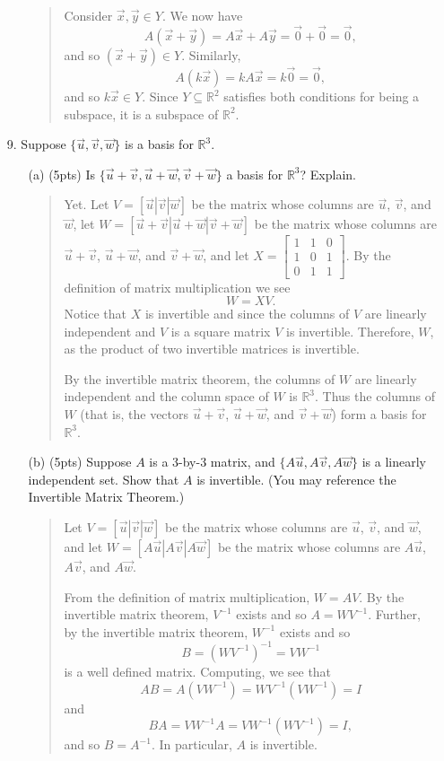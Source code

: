 \documentclass[11pt]{article}
\newcommand{\R}{\mathbb{R}}
\newcommand{\mat}[1]{\begin{bmatrix}#1\end{bmatrix}}
\newenvironment{answer}{\begin{quote}\sffamily}{\end{quote}}
\begin{document}
\begin{enumerate}
\begin{enumerate}
\begin{answer}
			Consider $\vec x,\vec y\in Y$.  We now have
			\[
				A(\vec x+\vec y)=A\vec x+A\vec y=\vec 0+\vec 0=\vec 0,
			\]
			and so $(\vec x+\vec y)\in Y$.  Similarly,
			\[
				A(k\vec x)=kA\vec x=k\vec 0=\vec 0,
			\]
			and so $k\vec x\in Y$.  Since $Y\subseteq \R^2$ satisfies both conditions for being a subspace, it is
			a subspace of $\R^2$.
		\end{answer}
	\end{enumerate}
	
	\newpage
	\item[9.] Suppose $\{\vec{u},\vec{v},\vec{w}\}$ is a basis for $\R^3$.
	\begin{enumerate}
		\item[(a) (5pts)] Is $\{\vec{u} + \vec{v}, \vec{u}+\vec{w}, \vec{v}+\vec{w}\}$ a basis for $\R^3$?  Explain.
		\begin{answer}
			Yet.  Let $V=[\vec u|\vec v|\vec w]$ be the matrix whose columns are $\vec u$, $\vec v$, and $\vec w$,
			let $W=[\vec u+\vec v|\vec u+\vec w|\vec v+\vec w]$ be the matrix whose columns are $\vec u+\vec v$,
			$\vec u+\vec w$, and $\vec v+\vec w$, 
			and let $X=\mat{1&1&0\\1&0&1\\0&1&1}$.  By the definition of matrix multiplication we see
			\[
				W=XV.
			\]
			Notice that $X$ is invertible and since the columns of $V$ are linearly independent and $V$ is a square
			matrix $V$ is invertible.  Therefore, $W$, as the product of two invertible matrices is invertible.

			By the invertible matrix theorem, the columns of $W$ are linearly independent and the column space of $W$
			is $\R^3$.  Thus the columns of $W$ (that is, the vectors $\vec u+\vec v$,
			$\vec u+\vec w$, and $\vec v+\vec w$) form a basis for $\R^3$.
		\end{answer}
		
		\item[(b) (5pts)] Suppose $A$ is a 3-by-3 matrix, and $\{A\vec{u},A\vec{v},A\vec{w}\}$ is a linearly independent set.  Show that $A$ is invertible.  (You may reference the Invertible Matrix Theorem.)
		\begin{answer}
			Let $V=[\vec u|\vec v|\vec w]$ be the matrix whose columns are $\vec u$, $\vec v$, and $\vec w$,
			and let $W=[A\vec u|A\vec v|A\vec w]$ be the matrix whose columns are $A\vec u$, $A\vec v$, and $A\vec w$.

			From the definition of matrix multiplication, $W=AV$.  By the invertible matrix theorem,
			$V^{-1}$ exists and so $A=WV^{-1}$.  Further, by the invertible matrix theorem, $W^{-1}$ exists
			and so
			\[
				B=(WV^{-1})^{-1} = VW^{-1}
			\]
			is a well defined matrix.  Computing, we see that
			\[
				AB=A(VW^{-1})=WV^{-1}(VW^{-1})=I
			\]
			and
			\[
				BA=VW^{-1}A = VW^{-1}(WV^{-1})=I,
			\]
			and so $B=A^{-1}$.  In particular, $A$ is invertible.
		\end{answer}
		
	\end{enumerate}
	
\end{enumerate}
\end{document}
